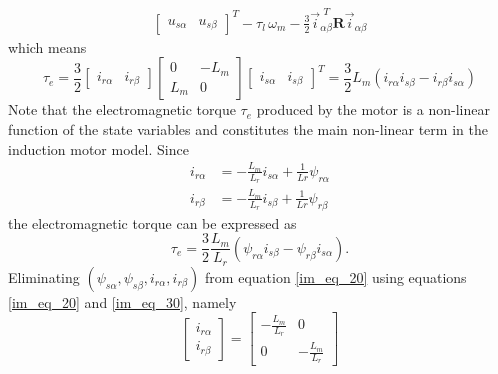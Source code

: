 \documentclass[11pt,a4paper]{scrartcl}
\numberwithin{equation}{section}
\theoremstyle{it}
\theoremstyle{definition}
\begin{document}
\begin{onehalfspace}
\begin{equation}
\begin{aligned}
		\left[\begin{matrix}
			u_{s\alpha} & u_{s\beta}
		\end{matrix}\right]^T 
		-\tau_l\,\omega_m-\frac{3}{2}\vec{i}_{\alpha\beta}^{\,\,T}\mathbf{R}\vec{i}_{\alpha\beta}
	\end{aligned}
\end{equation}
which means 
\begin{equation}\label{im_eq_29}
	\tau_e = 
	\frac{3}{2}\left[\begin{matrix}
		i_{r\alpha} & i_{r\beta}
	\end{matrix}\right]
	\left[\begin{matrix}
		0 & -L_m \\
		L_m & 0
	\end{matrix}\right]
	\left[\begin{matrix}
		i_{s\alpha} & i_{s\beta}
	\end{matrix}\right]^T = 
	\frac{3}{2}L_m\left(i_{r\alpha} i_{s\beta} - i_{r\beta} i_{s\alpha}\right)
\end{equation}
Note that the electromagnetic torque $\tau_e$ produced by the motor is a 
non-linear function of the state variables and constitutes the main non-linear 
term in the induction motor model. Since
\begin{equation}\label{im_eq_30}
	\begin{aligned}
		i_{r\alpha} &= -\frac{L_m}{L_r}i_{s\alpha}+\frac{1}{Lr}\psi_{r\alpha} 
		\\[8pt]
		i_{r\beta} &= -\frac{L_m}{L_r}i_{s\beta}+\frac{1}{Lr}\psi_{r\beta}
	\end{aligned}
\end{equation}
the electromagnetic torque can be expressed as
\begin{equation}\label{im_eq_31}
	\tau_{e} = 
	\frac{3}{2}\frac{L_m}{L_r}\left(\psi_{r\alpha}i_{s\beta}-\psi_{r\beta}i_{s\alpha}\right).
\end{equation}
Eliminating $\left(\psi_{s\alpha}, \psi_{s\beta}, i_{r\alpha}, 
i_{r\beta}\right)$ from equation  \ref{im_eq_20} using equations \ref{im_eq_20} 
and \ref{im_eq_30}, namely
\begin{equation}\label{im_eq_32}
	\left[\begin{matrix}
		i_{r\alpha} \\[6pt]
		i_{r\beta}
	\end{matrix}\right] = 
	\left[\begin{matrix}
		-\frac{L_m}{L_r} & 0 \\[6pt]
		0 & -\frac{L_m}{L_r}
	\end{matrix}\right]

\end{equation}
\end{onehalfspace}
\end{document}
